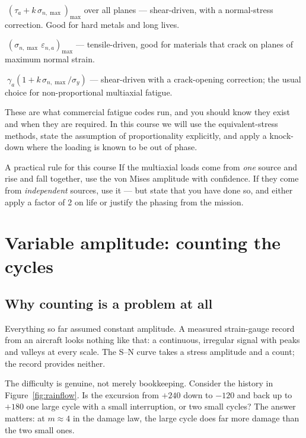 \documentclass[11pt,a4paper]{article}
\begin{document}
\begin{description}[nosep,leftmargin=1.6cm,style=nextline]
  \item[Findley] $\;\left(\tau_a+k\,\sigma_{n,\max}\right)_{\max}$ over all planes --- shear-driven, with a normal-stress correction. Good for hard metals and long lives.
  \item[Smith--Watson--Topper] $\;\left(\sigma_{n,\max}\,\varepsilon_{n,a}\right)_{\max}$ --- tensile-driven, good for materials that crack on planes of maximum normal strain.
  \item[Fatemi--Socie] $\;\gamma_a\left(1+k\,\sigma_{n,\max}/\sigma_y\right)$ --- shear-driven with a crack-opening correction; the usual choice for non-proportional multiaxial fatigue.
\end{description}

These are what commercial fatigue codes run, and you should know they exist and when they are required. In this course we will use the equivalent-stress methods, state the assumption of proportionality explicitly, and apply a knock-down where the loading is known to be out of phase.

\begin{keybox}{A practical rule for this course}
If the multiaxial loads come from \emph{one} source and rise and fall together, use the von Mises amplitude with confidence. If they come from \emph{independent} sources, use it --- but state that you have done so, and either apply a factor of 2 on life or justify the phasing from the mission.
\end{keybox}

\section{Variable amplitude: counting the cycles}

\subsection{Why counting is a problem at all}
Everything so far assumed constant amplitude. A measured strain-gauge record from an aircraft looks nothing like that: a continuous, irregular signal with peaks and valleys at every scale. The S--N curve takes a stress amplitude and a count; the record provides neither.

The difficulty is genuine, not merely bookkeeping. Consider the history in Figure~\ref{fig:rainflow}. Is the excursion from $+240$ down to $-120$ and back up to $+180$ one large cycle with a small interruption, or two small cycles? The answer matters: at $m\approx4$ in the damage law, the large cycle does far more damage than the two small ones.
\end{document}
